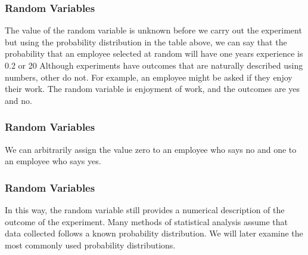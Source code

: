 \documentclass[IntroMain.tex]{subfiles}
\begin{document}
\begin{frame}
	\frametitle{Random Variables}	
	The value of the random variable is unknown before we carry out the experiment but using the probability distribution in the table above, we can say that the probability that an employee selected at random will have one years experience is 0.2 or 20%
	Although experiments have outcomes that are naturally described using numbers, other do not. For example, an employee might be asked if they enjoy their work. The random variable is enjoyment of work, and the outcomes are yes and no.
\end{frame}

\begin{frame}
	\frametitle{Random Variables}	
	We can arbitrarily assign the value zero to an employee who says no and one to an employee who says yes.
\end{frame}

\begin{frame}
	\frametitle{Random Variables}		
	In this way, the random variable still provides a numerical description of the outcome of the experiment.
	Many methods of statistical analysis assume that data collected follows a known probability distribution. We will later examine the most commonly used probability distributions.
\end{frame}
	
\end{document}
